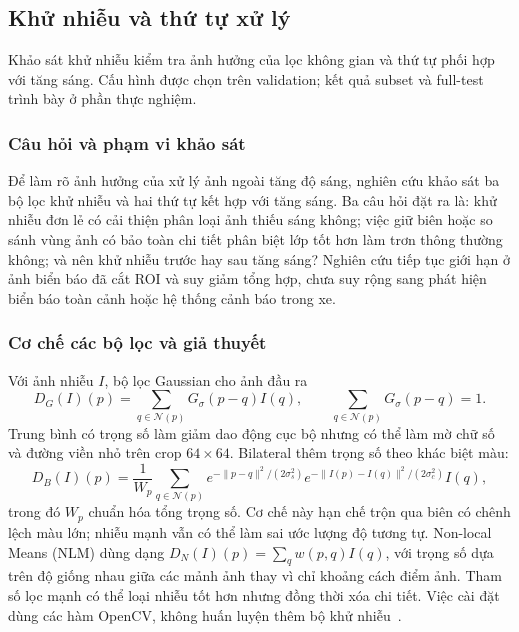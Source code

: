 \subsection{Khử nhiễu và thứ tự xử lý}
\label{sec:processing-extension}
Khảo sát khử nhiễu kiểm tra ảnh hưởng của lọc không gian và thứ tự phối hợp với tăng sáng. Cấu hình được chọn trên validation; kết quả subset và full-test trình bày ở phần thực nghiệm.

\subsubsection{Câu hỏi và phạm vi khảo sát}
Để làm rõ ảnh hưởng của xử lý ảnh ngoài tăng độ sáng, nghiên cứu khảo sát ba bộ lọc khử nhiễu và hai thứ tự kết hợp với tăng sáng. Ba câu hỏi đặt ra là: khử nhiễu đơn lẻ có cải thiện phân loại ảnh thiếu sáng không; việc giữ biên hoặc so sánh vùng ảnh có bảo toàn chi tiết phân biệt lớp tốt hơn làm trơn thông thường không; và nên khử nhiễu trước hay sau tăng sáng? Nghiên cứu tiếp tục giới hạn ở ảnh biển báo đã cắt ROI và suy giảm tổng hợp, chưa suy rộng sang phát hiện biển báo toàn cảnh hoặc hệ thống cảnh báo trong xe.

\subsubsection{Cơ chế các bộ lọc và giả thuyết}
Với ảnh nhiễu $I$, bộ lọc Gaussian cho ảnh đầu ra
\begin{equation}
 D_G(I)(p)=\sum_{q\in\mathcal N(p)}G_{\sigma}(p-q)I(q),
 \qquad \sum_{q\in\mathcal N(p)}G_{\sigma}(p-q)=1.
\end{equation}
Trung bình có trọng số làm giảm dao động cục bộ nhưng có thể làm mờ chữ số và đường viền nhỏ trên crop $64\times64$. Bilateral thêm trọng số theo khác biệt màu:
\begin{equation}
 D_B(I)(p)=\frac{1}{W_p}\sum_{q\in\mathcal N(p)}
 e^{-\|p-q\|^2/(2\sigma_s^2)}
 e^{-\|I(p)-I(q)\|^2/(2\sigma_c^2)}I(q),
\end{equation}
trong đó $W_p$ chuẩn hóa tổng trọng số. Cơ chế này hạn chế trộn qua biên có chênh lệch màu lớn; nhiễu mạnh vẫn có thể làm sai ước lượng độ tương tự. Non-local Means (NLM) dùng dạng $D_N(I)(p)=\sum_q w(p,q)I(q)$, với trọng số dựa trên độ giống nhau giữa các mảnh ảnh thay vì chỉ khoảng cách điểm ảnh. Tham số lọc mạnh có thể loại nhiễu tốt hơn nhưng đồng thời xóa chi tiết. Việc cài đặt dùng các hàm OpenCV, không huấn luyện thêm bộ khử nhiễu~\cite{opencv_filter,opencv_nlm}.

